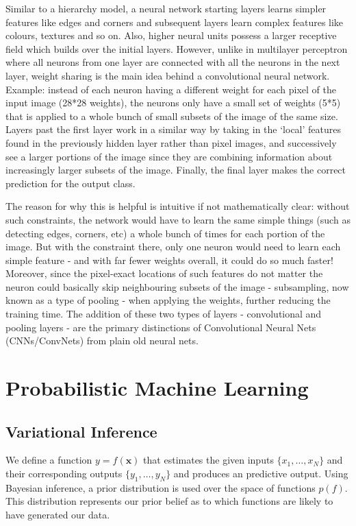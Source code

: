 Similar to a hierarchy model, a neural network starting layers learns simpler features like edges and corners and subsequent layers learn complex features like colours, textures and so on. Also, higher neural units possess a larger receptive field which builds over the initial layers. However, unlike in multilayer perceptron where all neurons from one layer are connected with all the neurons in the next layer, weight sharing is the main idea behind a convolutional neural network. 
Example: instead of each neuron having a different weight for each pixel of the input image (28*28 weights), the neurons only have a small set of weights (5*5) that is applied to a whole bunch of small subsets of the image of the same size. Layers past the first layer work in a similar way by taking in the ‘local’ features found in the previously hidden layer rather than pixel images, and successively see a larger portions of the image since they are combining information about increasingly larger subsets of the image. Finally, the final layer makes the correct prediction for the output class.

The reason for why this is helpful is intuitive if not mathematically clear: without such constraints, the network would have to learn the same simple things (such as detecting edges, corners, etc) a whole bunch of times for each portion of the image. But with the constraint there, only one neuron would need to learn each simple feature - and with far fewer weights overall, it could do so much faster! Moreover, since the pixel-exact locations of such features do not matter the neuron could basically skip neighbouring subsets of the image - subsampling, now known as a type of pooling - when applying the weights, further reducing the training time. The addition of these two types of layers - convolutional and pooling layers - are the primary distinctions of Convolutional Neural Nets (CNNs/ConvNets) from plain old neural nets.


\section{Probabilistic Machine Learning}
\subsection{Variational Inference}

We define a function $y = f(\mathbf{x})$ that estimates the given inputs $\{ x_1, \hdots, x_N \}$ and their corresponding outputs $\{y_1, \hdots, y_N\}$ and produces an predictive output. Using Bayesian inference, a prior distribution is used over the space of functions $p(f)$. This distribution represents our prior belief as to which functions are likely to have generated our data. 

